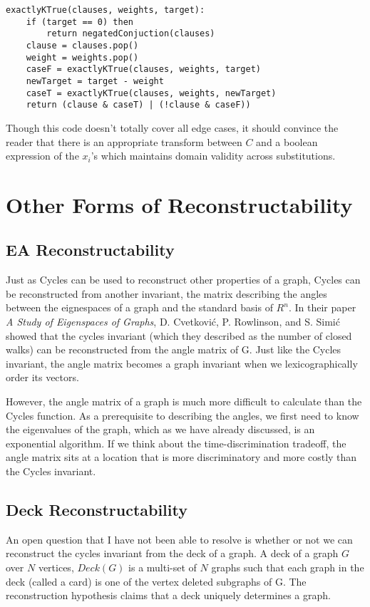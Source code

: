 \begin{lstlisting}[frame=single]
exactlyKTrue(clauses, weights, target):
	if (target == 0) then
		return negatedConjuction(clauses)
	clause = clauses.pop()
	weight = weights.pop()
	caseF = exactlyKTrue(clauses, weights, target)
	newTarget = target - weight
	caseT = exactlyKTrue(clauses, weights, newTarget)
	return (clause & caseT) | (!clause & caseF))
\end{lstlisting}

Though this code doesn't totally cover all edge cases, it should convince the reader that there is an appropriate transform between $C$ and a boolean expression of the $x_i$'s which maintains domain validity across substitutions.

\section{Other Forms of Reconstructability}

\subsection{EA Reconstructability}

Just as Cycles can be used to reconstruct other properties of a graph, Cycles can be reconstructed from another invariant, the matrix describing the angles between the eignespaces of a graph and the standard basis of $R^n$.
In their paper \emph{A Study of Eigenspaces of Graphs}, D. Cvetkovi\'c, P. Rowlinson, and S. Simi\'c showed that the cycles invariant (which they described as the number of closed walks) can be reconstructed from the angle matrix of G.
Just like the Cycles invariant, the angle matrix becomes a graph invariant when we lexicographically order its vectors.

However, the angle matrix of a graph is much more difficult to calculate than the Cycles function.
As a prerequisite to describing the angles, we first need to know the eigenvalues of the graph, which as we have already discussed, is an exponential algorithm.
If we think about the time-discrimination tradeoff, the angle matrix sits at a location that is more discriminatory and more costly than the Cycles invariant.

\subsection{Deck Reconstructability}

An open question that I have not been able to resolve is whether or not we can reconstruct the cycles invariant from the deck of a graph.
A deck of a graph $G$ over $N$ vertices, $Deck(G)$ is a multi-set of $N$ graphs such that each graph in the deck (called a card) is one of the vertex deleted subgraphs of G. 
The reconstruction hypothesis claims that a deck uniquely determines a graph.

